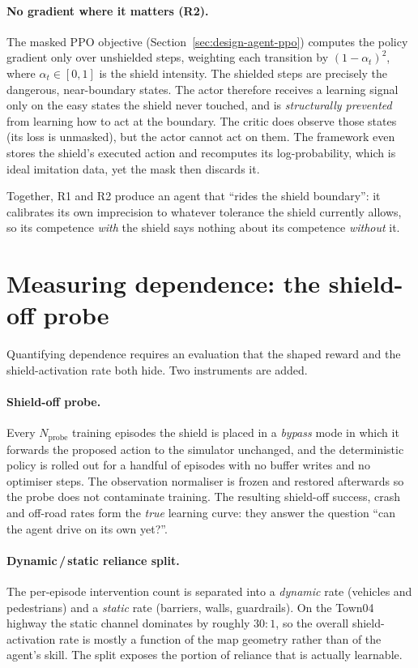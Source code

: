 \paragraph{No gradient where it matters (R2).} The masked PPO objective
(Section~\ref{sec:design-agent-ppo}) computes the policy gradient only over unshielded steps,
weighting each transition by \((1-\alpha_t)^2\), where \(\alpha_t\in[0,1]\) is the shield
intensity. The shielded steps are precisely the dangerous, near-boundary states. The actor
therefore receives a learning signal only on the easy states the shield never touched, and is
\emph{structurally prevented} from learning how to act at the boundary. The critic does observe
those states (its loss is unmasked), but the actor cannot act on them. The framework even stores
the shield's executed action and recomputes its log-probability, which is ideal imitation data,
yet the mask then discards it.

Together, R1 and R2 produce an agent that ``rides the shield boundary'': it calibrates its own
imprecision to whatever tolerance the shield currently allows, so its competence \emph{with} the
shield says nothing about its competence \emph{without} it.

\section{Measuring dependence: the shield-off probe}\label{sec:dep-probe}

Quantifying dependence requires an evaluation that the shaped reward and the shield-activation
rate both hide. Two instruments are added.

\paragraph{Shield-off probe.} Every \(N_{\mathrm{probe}}\) training episodes the shield is placed
in a \emph{bypass} mode in which it forwards the proposed action to the simulator unchanged, and
the deterministic policy is rolled out for a handful of episodes with no buffer writes and no
optimiser steps. The observation normaliser is frozen and restored afterwards so the probe does
not contaminate training. The resulting shield-off success, crash and off-road rates form the
\emph{true} learning curve: they answer the question ``can the agent drive on its own yet?''.

\paragraph{Dynamic\,/\,static reliance split.} The per-episode intervention count is separated
into a \emph{dynamic} rate (vehicles and pedestrians) and a \emph{static} rate (barriers, walls,
guardrails). On the Town04 highway the static channel dominates by roughly \(30{:}1\), so the
overall shield-activation rate is mostly a function of the map geometry rather than of the
agent's skill. The split exposes the portion of reliance that is actually learnable.

